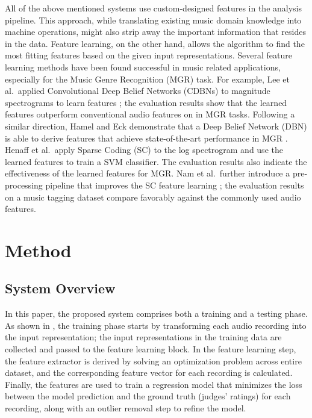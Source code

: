 \documentclass{article}
\begin{document}
All of the above mentioned systems use custom-designed features in the analysis pipeline. This approach, while translating existing music domain knowledge into machine operations, might also strip away the important information that resides in the data. Feature learning, on the other hand, allows the algorithm to find the most fitting features based on the given input representations. Several feature learning methods have been found successful in music related applications, especially for the Music Genre Recognition (MGR) task. For example, Lee et al.\  applied Convolutional Deep Belief Networks (CDBNs) to magnitude spectrograms to learn features \cite{Lee2009a}; the evaluation results show that the learned features outperform conventional audio features on in MGR tasks. Following a similar direction, Hamel and Eck demonstrate that a Deep Belief Network (DBN) is able to derive features that achieve state-of-the-art performance in MGR \cite{Hamel2010}. Henaff et al.\  apply Sparse Coding (SC) to the log spectrogram and use the learned features to train a SVM classifier. The evaluation results also indicate the effectiveness of the learned features for MGR. Nam et al.\  further introduce a pre-processing pipeline that improves the SC feature learning \cite{Nam2012}; the evaluation results on a music tagging dataset compare favorably against the commonly used audio features.  


\section{Method}\label{sec:method}
\subsection{System Overview}
In this paper, the proposed system comprises both a training and a testing phase. As shown in , the training phase starts by transforming each audio recording into the input representation; the input representations in the training data are collected and passed to the feature learning block. In the feature learning step, the feature extractor is derived by solving an optimization problem across entire dataset, and the corresponding feature vector for each recording is calculated. Finally, the features are used to train a regression model that minimizes the loss between the model prediction and the ground truth (judges' ratings) for each recording, along with an outlier removal step to refine the model. 
\end{document}
